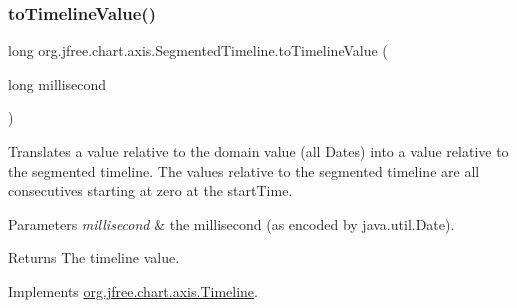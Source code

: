 \mbox{\label{classorg_1_1jfree_1_1chart_1_1axis_1_1_segmented_timeline_adade2f77808e594498067a2b70a6099e}} 
\subsubsection{\texorpdfstring{to\+Timeline\+Value()}{toTimelineValue()}\hspace{0.1cm}{\footnotesize\ttfamily [1/2]}}
{\footnotesize\ttfamily long org.\+jfree.\+chart.\+axis.\+Segmented\+Timeline.\+to\+Timeline\+Value (\begin{DoxyParamCaption}\item[{long}]{millisecond }\end{DoxyParamCaption})}

Translates a value relative to the domain value (all Dates) into a value relative to the segmented timeline. The values relative to the segmented timeline are all consecutives starting at zero at the start\+Time.


\begin{DoxyParams}{Parameters}
{\em millisecond} & the millisecond (as encoded by java.\+util.\+Date).\\
\hline
\end{DoxyParams}
\begin{DoxyReturn}{Returns}
The timeline value. 
\end{DoxyReturn}


Implements \mbox{\hyperlink{interfaceorg_1_1jfree_1_1chart_1_1axis_1_1_timeline_a8723dcd01acdfba8854165da93d1d72a}{org.\+jfree.\+chart.\+axis.\+Timeline}}.

\mbox{\label{classorg_1_1jfree_1_1chart_1_1axis_1_1_segmented_timeline_a9ceca997773324de3d7164b023c1c0e0}} 
